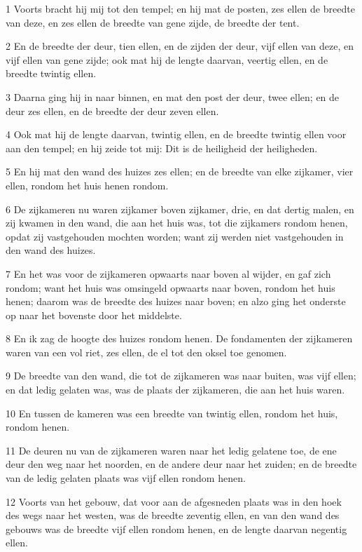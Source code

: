 \par 1 Voorts bracht hij mij tot den tempel; en hij mat de posten, zes ellen de breedte van deze, en zes ellen de breedte van gene zijde, de breedte der tent.
\par 2 En de breedte der deur, tien ellen, en de zijden der deur, vijf ellen van deze, en vijf ellen van gene zijde; ook mat hij de lengte daarvan, veertig ellen, en de breedte twintig ellen.
\par 3 Daarna ging hij in naar binnen, en mat den post der deur, twee ellen; en de deur zes ellen, en de breedte der deur zeven ellen.
\par 4 Ook mat hij de lengte daarvan, twintig ellen, en de breedte twintig ellen voor aan den tempel; en hij zeide tot mij: Dit is de heiligheid der heiligheden.
\par 5 En hij mat den wand des huizes zes ellen; en de breedte van elke zijkamer, vier ellen, rondom het huis henen rondom.
\par 6 De zijkameren nu waren zijkamer boven zijkamer, drie, en dat dertig malen, en zij kwamen in den wand, die aan het huis was, tot die zijkamers rondom henen, opdat zij vastgehouden mochten worden; want zij werden niet vastgehouden in den wand des huizes.
\par 7 En het was voor de zijkameren opwaarts naar boven al wijder, en gaf zich rondom; want het huis was omsingeld opwaarts naar boven, rondom het huis henen; daarom was de breedte des huizes naar boven; en alzo ging het onderste op naar het bovenste door het middelste.
\par 8 En ik zag de hoogte des huizes rondom henen. De fondamenten der zijkameren waren van een vol riet, zes ellen, de el tot den oksel toe genomen.
\par 9 De breedte van den wand, die tot de zijkameren was naar buiten, was vijf ellen; en dat ledig gelaten was, was de plaats der zijkameren, die aan het huis waren.
\par 10 En tussen de kameren was een breedte van twintig ellen, rondom het huis, rondom henen.
\par 11 De deuren nu van de zijkameren waren naar het ledig gelatene toe, de ene deur den weg naar het noorden, en de andere deur naar het zuiden; en de breedte van de ledig gelaten plaats was vijf ellen rondom henen.
\par 12 Voorts van het gebouw, dat voor aan de afgesneden plaats was in den hoek des wegs naar het westen, was de breedte zeventig ellen, en van den wand des gebouws was de breedte vijf ellen rondom henen, en de lengte daarvan negentig ellen.
